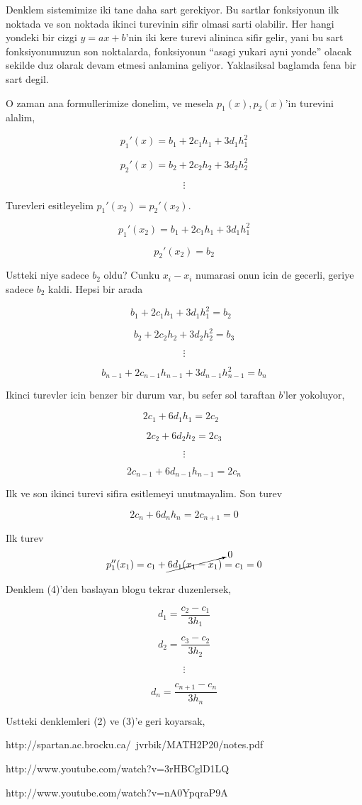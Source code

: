 \documentclass[12pt,fleqn]{article}\usepackage{common}
\begin{document}
Denklem sistemimize iki tane daha sart gerekiyor. Bu sartlar fonksiyonun
ilk noktada ve son noktada ikinci turevinin sifir olmasi sarti
olabilir. Her hangi yondeki bir cizgi $y = ax + b$'nin iki kere turevi
alininca sifir gelir, yani bu sart fonksiyonumuzun son noktalarda,
fonksiyonun ``asagi yukari ayni yonde'' olacak sekilde duz olarak devam
etmesi anlamina geliyor. Yaklasiksal baglamda fena bir sart degil. 

O zaman ana formullerimize donelim, ve mesela $p_1(x),p_2(x)$'in turevini
alalim,

\[ p_1'(x) = b_1 + 2c_1h_1 + 3d_1h_1^2 \]

\[ p_2'(x) = b_2 + 2c_2h_2 + 3d_2h_2^2 \]

\[ \vdots \]


Turevleri esitleyelim $p_1'(x_2) = p_2'(x_2)$. 

\[ p_1'(x_2) = b_1 + 2c_1h_1 + 3d_1h_1^2 \]

\[  p_2'(x_2) = b_2 \]

Ustteki niye sadece $b_2$ oldu? Cunku $x_i-x_i$ numarasi onun icin de
gecerli, geriye sadece $b_2$ kaldi. Hepsi bir arada

\[  b_1 + 2c_1h_1 + 3d_1h_1^2  = b_2 \ \ \ \label{3}\]

\[  b_2 + 2c_2h_2 + 3d_2h_2^2 = b_3 \]

\[ \vdots \]

\[  b_{n-1} + 2c_{n-1}h_{n-1} + 3d_{n-1}h_{n-1}^2 =  b_n \]

Ikinci turevler icin benzer bir durum var, bu sefer sol taraftan $b$'ler
yokoluyor, 

\[ 2c_1 + 6d_1h_1 = 2c_2 \ \ \ \label{4} \]

\[ 2c_2 + 6d_2h_2 = 2c_3 \]

\[ \vdots \]

\[ 2c_{n-1} + 6d_{n-1}h_{n-1} = 2c_n \]

Ilk ve son ikinci turevi sifira esitlemeyi unutmayalim. Son turev

\[ 2c_n + 6d_nh_n = 2c_{n+1} = 0 \]

Ilk turev
\[ p_1''(x_1) =  c_1 + \cancelto{0}{6d_1(x_1-x_1)}  = c_1 = 0\]

Denklem (4)'den baslayan blogu tekrar duzenlersek, 

\[ d_1 = \frac{ c_2 - c_1}{3h_1} \]

\[ d_2 = \frac{ c_3 - c_2}{3h_2} \]

\[ \vdots \]

\[ d_n = \frac{ c_{n+1} - c_n}{3h_n} \]


Ustteki denklemleri (2) ve (3)'e geri koyarsak,










http://spartan.ac.brocku.ca/~jvrbik/MATH2P20/notes.pdf

http://www.youtube.com/watch?v=3rHBCglD1LQ

http://www.youtube.com/watch?v=nA0YpqraP9A
\end{document}
